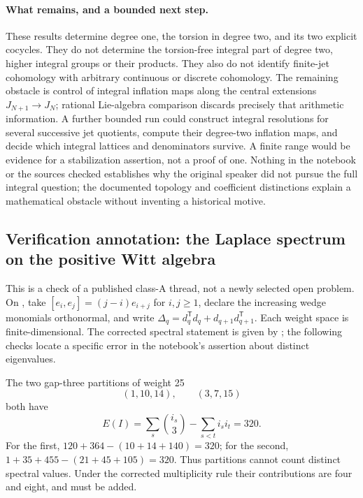 \paragraph{What remains, and a bounded next step.}
These results determine degree one, the torsion in degree two, and its two
explicit cocycles. They do not determine the torsion-free integral part of
degree two, higher integral groups or their products. They also do not
identify finite-jet cohomology with arbitrary continuous or discrete
cohomology. The remaining obstacle is control of integral inflation maps
along the central extensions \(J_{N+1}\to J_N\); rational Lie-algebra
comparison discards precisely that arithmetic information. A further
bounded run could construct integral resolutions for several successive
jet quotients, compute their degree-two inflation maps, and decide which
integral lattices and denominators survive. A finite range would be
evidence for a stabilization assertion, not a proof of one. Nothing in
the notebook or the sources checked establishes why the original speaker
did not pursue the full integral question; the documented topology and
coefficient distinctions explain a mathematical obstacle without inventing
a historical motive.

\subsection{Verification annotation: the Laplace spectrum on the positive Witt algebra}
\label{dev:1977-laplacian-check}
This is a check of a published class-A thread, not a newly selected open
problem. On , take
\([e_i,e_j]=(j-i)e_{i+j}\) for \(i,j\geq1\), declare the increasing wedge
monomials orthonormal, and write
\(\Delta_q=d_q^{\mathsf T}d_q+d_{q+1}d_{q+1}^{\mathsf T}\).
Each weight space is finite-dimensional. The corrected spectral statement
is given by \citet[Theorem~2, p.~324]{fuchswilmarth2010laplacian}; the following checks locate a
specific error in the notebook's assertion about distinct eigenvalues.

\begin{example}\oursComputed
The two gap-three partitions of weight 25
\[
 (1,10,14),\qquad(3,7,15)
\]
both have
\[
 E(I)=\sum_s\binom{i_s}{3}-\sum_{s<t}i_si_t=320.
\]
For the first, \(120+364-(10+14+140)=320\); for the second,
\(1+35+455-(21+45+105)=320\). Thus partitions cannot count
distinct spectral values. Under the corrected multiplicity rule their
contributions are four and eight, and must be added.
\end{example}

